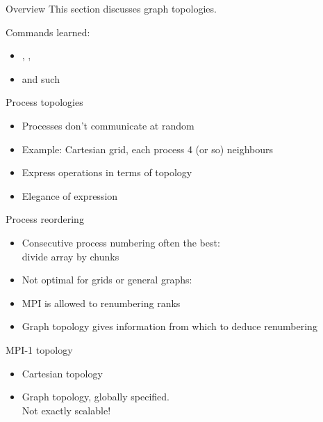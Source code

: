
\begin{frame}[containsverbatim]{Overview}
  This section discusses graph topologies.

  Commands learned:
  \begin{itemize}
  \item {}, ,
  \item {} and such
  \end{itemize}
\end{frame}

\begin{frame}[containsverbatim]{Process topologies}
  \begin{itemize}
  \item Processes don't communicate at random
  \item Example: Cartesian grid, each process 4 (or so) neighbours
  \item Express operations in terms of topology
  \item Elegance of expression
  \end{itemize}
\end{frame}

\begin{frame}[containsverbatim]{Process reordering}
  \begin{itemize}
  \item Consecutive process numbering often the best:\\
    divide array by chunks
  \item Not optimal for grids or general graphs:
  \item MPI is allowed to renumbering ranks
  \item Graph topology gives information from which to deduce
    renumbering
  \end{itemize}
\end{frame}

\begin{frame}[containsverbatim]{MPI-1 topology}
  \begin{itemize}
  \item Cartesian topology
  \item Graph topology, globally specified.\\
    Not exactly scalable!
  \end{itemize}
\end{frame}

